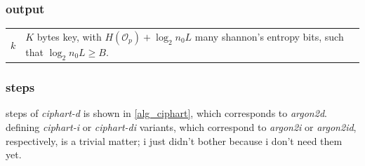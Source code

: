 \documentclass[twocolumn]{article}
\begin{document}
\subsubsection{output}
\begin{tabularx}{\columnwidth}{lX}
$k$ & $K$ bytes key, with $H(\mathcal{O}_p) + \log_2 n_0L$ many shannon's
        entropy bits, such that $\log_2 n_0L \ge B$.\\
\end{tabularx}

\subsubsection{steps}
steps of \emph{ciphart-d} is shown in \cref{alg_ciphart}, which corresponds
to \emph{argon2d}.  defining \emph{ciphart-i} or \emph{ciphart-di}
variants, which correspond to \emph{argon2i} or \emph{argon2id},
respectively, is a trivial matter; i just didn't bother because i don't
need them yet.
\end{document}
